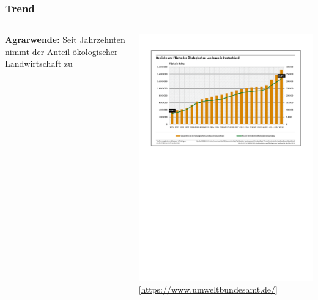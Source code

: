 \documentclass{beamer}
\begin{document}
\begin{frame}
\frametitle{Trend}
\begin{columns}[c] %

\textbf{Agrarwende:}
Seit Jahrzehnten nimmt der Anteil ökologischer Landwirtschaft zu

\includegraphics[scale=0.5]{oekolandbau.pdf}\\
\tiny [\url{https://www.umweltbundesamt.de/}]
\end{columns}
\end{frame}

\end{document}
